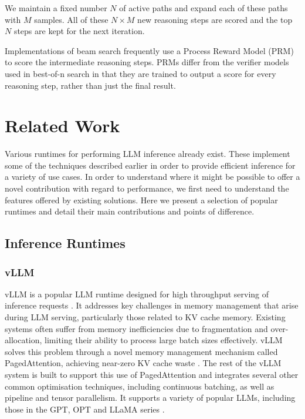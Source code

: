 \documentclass[11pt,twoside]{report}
\begin{document}
We maintain a fixed number $N$ of active paths and expand each of these paths with $M$ samples. 
All of these $N \times M$ new reasoning steps are scored and the top $N$ steps are kept for the next iteration. 

Implementations of beam search frequently use a Process Reward Model (PRM) to score the intermediate reasoning steps. 
PRMs differ from the verifier models used in best-of-n search in that they are trained to output a score for every reasoning step, rather than just the final result.


\chapter{Related Work}\label{chapter:relatedwork}
Various runtimes for performing LLM inference already exist.
These implement some of the techniques described earlier in order to provide efficient inference for a variety of use cases.
In order to understand where it might be possible to offer a novel contribution with regard to performance, we first need to understand the features offered by existing solutions.
Here we present a selection of popular runtimes and detail their main contributions and points of difference.
\section{Inference Runtimes}\label{section:inferenceruntimes}
\subsection{vLLM}
vLLM is a popular LLM runtime designed for high throughput serving of inference requests \cite{kwon2023efficient}.
It addresses key challenges in memory management that arise during LLM serving, particularly those related to KV cache memory.
Existing systems often suffer from memory inefficiencies due to fragmentation and over-allocation, limiting their ability to process large batch sizes effectively.
vLLM solves this problem through a novel memory management mechanism called PagedAttention, achieving near-zero KV cache waste \cite{kwon2023efficient}.
The rest of the vLLM system is built to support this use of PagedAttention and integrates several other common optimisation techniques, including continuous batching, as well as pipeline and tensor parallelism.
It supports a variety of popular LLMs, including those in the GPT, OPT and LLaMA series \cite{radford2018improving} \cite{zhang2022opt} \cite{touvron2023llama}.
\end{document}
